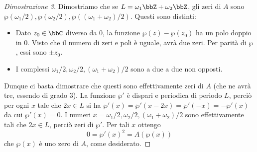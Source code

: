 \begin{proof}[Dimostrazione 3]
Dimostriamo che se $L=\omega_1\bbZ + \omega_2 \bbZ$, gli zeri di $A$ sono $ \wp(\omega_1/2), \wp(\omega_2/2), \wp((\omega_1+\omega_2)/2)$. Questi sono distinti:
\begin{itemize}
\item Dato $z_0 \in \bbC$ diverso da $0$, la funzione $\wp(z) - \wp(z_0)$ ha un polo doppio in 0. Visto che il numero di zeri e poli è uguale, avrà due zeri. Per parità di $\wp$, essi sono $\pm z_0$.
\item I complessi $\omega_1/2, \omega_2/2, (\omega_1+\omega_2)/2$ sono a due a due non opposti.
\end{itemize}
Dunque ci basta dimostrare che questi sono effettivamente zeri di $A$ (che ne avrà tre, essendo di grado 3). La funzione $\wp'$ è dispari e periodica di periodo $L$, perciò per ogni $x$ tale che $2x \in L$ si ha
$\wp'(x) = \wp'(x-2x) = \wp'(-x) = -\wp'(x)$
da cui $\wp'(x) = 0$. I numeri $x=\omega_1/2, \omega_2/2, (\omega_1+\omega_2)/2$ sono effettivamente tali che $2x \in L$, perciò zeri di $\wp'$. Per tali $x$ ottengo
$$ 0 = \wp'(x)^2 = A(\wp(x))$$
che $\wp(x)$ è uno zero di $A$, come desiderato.
\end{proof}

